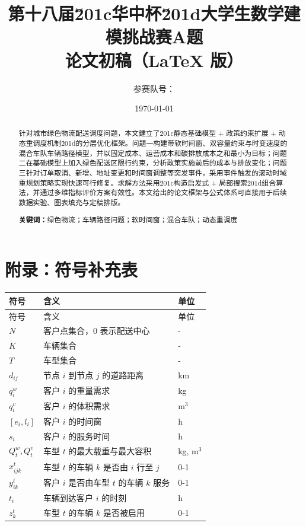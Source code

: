 \documentclass[UTF8,a4paper,12pt]{ctexart}
\title{第十八届\u201c华中杯\u201d大学生数学建模挑战赛A题\\论文初稿（LaTeX 版）}
\author{参赛队号：\underline{\hspace{4cm}}}
\date{\today}
\begin{document}
\maketitle

\begin{abstract}
针对城市绿色物流配送调度问题，本文建立了\u201c静态基础模型 + 政策约束扩展 + 动态重调度机制\u201d的分层优化框架。问题一构建带软时间窗、双容量约束与时变速度的混合车队车辆路径模型，并以固定成本、运营成本和碳排放成本之和最小为目标；问题二在基础模型上加入绿色配送区限行约束，分析政策实施前后的成本与排放变化；问题三针对订单取消、新增、地址变更和时间窗调整等突发事件，采用事件触发的滚动时域重规划策略实现快速可行修复。求解方法采用\u201c构造启发式 + 局部搜索\u201d组合算法，并通过多维指标评价方案有效性。本文给出的论文框架与公式体系可直接用于后续数据实验、图表填充与定稿排版。

\textbf{关键词：}绿色物流；车辆路径问题；软时间窗；混合车队；动态重调度
\end{abstract}

\tableofcontents
\newpage












\appendix
\section{附录：符号补充表}
\begin{longtable}{p{}p{}p{}}
\toprule
符号 & 含义 & 单位 \\
\midrule
\endfirsthead
\toprule
符号 & 含义 & 单位 \\
\midrule
\endhead
$N$ & 客户点集合，$0$ 表示配送中心 & - \\
$K$ & 车辆集合 & - \\
$T$ & 车型集合 & - \\
$d_{ij}$ & 节点 $i$ 到节点 $j$ 的道路距离 & km \\
$q_i^w$ & 客户 $i$ 的重量需求 & kg \\
$q_i^v$ & 客户 $i$ 的体积需求 & m$^3$ \\
$[e_i,l_i]$ & 客户 $i$ 的时间窗 & h \\
$s_i$ & 客户 $i$ 的服务时间 & h \\
$Q_t^w,Q_t^v$ & 车型 $t$ 的最大载重与最大容积 & kg, m$^3$ \\
$x_{ijk}^t$ & 车型 $t$ 的车辆 $k$ 是否由 $i$ 行至 $j$ & 0-1 \\
$y_{ik}^t$ & 客户 $i$ 是否由车型 $t$ 的车辆 $k$ 服务 & 0-1 \\
$t_i$ & 车辆到达客户 $i$ 的时刻 & h \\
$z_k^t$ & 车型 $t$ 的车辆 $k$ 是否被启用 & 0-1 \\
\bottomrule
\end{longtable}
\end{document}
